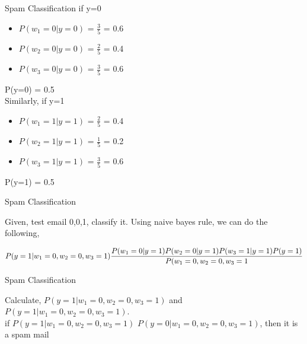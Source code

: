 \documentclass{beamer}
\begin{document}
\begin{frame}{Spam Classification}
    if y=0
    \begin{itemize}
        \item $P(w_{1}=0\vert y=0)$ = $\frac{3}{5}$ = 0.6 \\
        \item $P(w_{2}=0\vert y=0)$ = $\frac{2}{5}$ = 0.4 \\
        \item $P(w_{3}=0\vert y=0)$ = $\frac{3}{5}$ = 0.6 \\
    \end{itemize}
    P(y=0) = 0.5\\
    Similarly, if y=1
    \begin{itemize}
        \item $P(w_{1}=1\vert y=1)$ = $\frac{2}{5}$ = 0.4 \\
        \item $P(w_{2}=1\vert y=1)$ = $\frac{1}{5}$ = 0.2 \\
        \item $P(w_{3}=1\vert y=1)$ = $\frac{3}{5}$ = 0.6 \\
    \end{itemize}
    P(y=1) = 0.5
\end{frame}

\begin{frame}{Spam Classification}
    
    Given, test email {0,0,1}, classify it. Using naive bayes rule, we can do the following, 
    \begin{center}
$$
        P(y=1\vert w_{1}=0,w_{2} = 0,w_{3}=1) \\
         \frac{P(w_{1}=0|y=1) P(w_{2}=0|y=1) P(w_{3}=1|y=1) P(y=1)}{P(w_{1}=0, w_{2}=0, w_{3}=1} \\
    $$
    
    \end{center}
    
\end{frame}

\begin{frame}{Spam Classification}
    
    Calculate, $P(y=1 \vert w_{1}=0, w_{2}=0, w_{3}=1)$ and $P(y=1 \vert w_{1}=0, w_{2}=0, w_{3}=1)$.\\
    
    if $P(y=1 \vert w_{1}=0, w_{2}=0, w_{3}=1)$ \gt $P(y=0 \vert w_{1}=0, w_{2}=0, w_{3}=1)$, then it is a spam mail
\end{frame}
\end{document}
